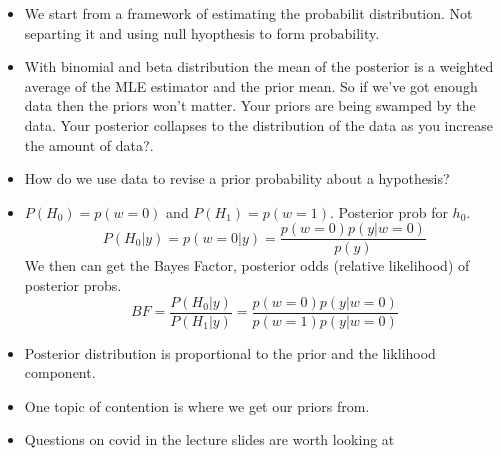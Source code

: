 \documentclass[12pt]{article}
\begin{document}
\begin{itemize}
      \item We start from a framework of estimating the probabilit distribution. Not separting it and using null hyopthesis to form probability.
      \item With binomial and beta distribution the mean of the posterior is a weighted average of the MLE estimator and the prior mean.
            So if we've got enough data then the priors won't matter. Your priors are being swamped by the data. Your posterior collapses to the distribution of the data as you increase the amount of data?.
      \item How do we use data to revise a prior probability about a hypothesis?
      \item $P(H_{0}) = p(w = 0)$ and $P(H_{1}) = p(w = 1)$.
            Posterior prob for $h_{0}$.
            $$P(H_{0}|y) =p(w = 0|y) = \frac{p(w = 0)p(y|w = 0)}{p(y)}$$
            We then can get the Bayes Factor, posterior odds (relative likelihood) of posterior probs.
            $$BF = \frac{P(H_{0}|y)}{P(H_{1}|y)} = \frac{p(w = 0)p(y|w = 0)}{p(w = 1)p(y|w = 0)}$$
      \item Posterior distribution is proportional to the prior and the liklihood component.
      \item One topic of contention is where we get our priors from.
      \item Questions on covid in the lecture slides are worth looking at
\end{itemize}
\end{document}
